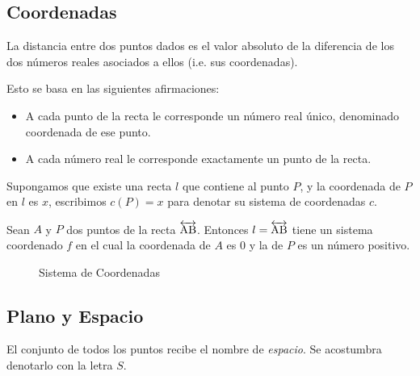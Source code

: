 \clearpage

\subsection{Coordenadas}

\begin{postulate}
    La distancia entre dos puntos dados es el valor absoluto de la diferencia de los dos números reales asociados a ellos (i.e. sus coordenadas).

    Esto se basa en las siguientes afirmaciones:
    
    \begin{itemize}
        \item A cada punto de la recta le corresponde un número real único, denominado coordenada de ese punto.
        \item A cada número real le corresponde exactamente un punto de la recta.    
    \end{itemize}

    Supongamos que existe una recta $l$ que contiene al punto $P$, y la coordenada de $P$ en $l$ es $x$, escribimos $c(P) = x$ para denotar su sistema de coordenadas $c$.
    
\end{postulate}

\begin{theorem}
    Sean $A$ y $P$ dos puntos de la recta $\overleftrightarrow{\rm AB}$. Entonces $l = \overleftrightarrow{\rm AB}$ tiene un sistema coordenado $f$ en el cual la coordenada de $A$ es $0$ y la de $P$ es un número positivo.

    \begin{figure}[!h]
        \centering
        
        \caption{Sistema de Coordenadas}
        \label{fig:plot18}
    \end{figure}

\end{theorem}

\clearpage

\subsection{Plano y Espacio}

\begin{definition}
El conjunto de todos los puntos recibe el nombre de \textit{espacio}. Se acostumbra denotarlo con la letra $S$.
\end{definition}

